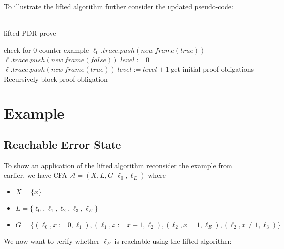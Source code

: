 \documentclass[11pt, a4paper, BCOR=10mm, ngerman, oneside]{scrbook}
\begin{document}
To illustrate the lifted algorithm further consider the updated pseudo-code: \\ \\

\begin{algorithm}[H] 
\caption{lifted-PDR-prove}
\begin{algorithmic}[1]
\State check for 0-counter-example
\State $\ell_0.trace.push(new\ frame(true))$
	\State $\ell.trace.push(new\ frame(false))$
\EndFor
\State $level := 0$
\Statex
\Loop
		\State $\ell.trace.push(new\ frame(true))$
	\EndFor
	\State $level:= level + 1$
	\State get initial proof-obligations 
	\Statex
	\State Recursively block proof-obligation
	\EndIf
	\EndWhile

	\Statex	
			\EndIf
		\EndFor
	\EndFor
\EndLoop
\EndProcedure
\end{algorithmic}
\end{algorithm}

\section{Example}
\subsection{Reachable Error State}
To show an application of the lifted algorithm reconsider the example from earlier, we have CFA  $\mathcal{A} = (X, L, G, \ell_0, \ell_E)$ where
\begin{itemize}
\item $X = \{x\}$
\item $L = \{\ell_0, \ell_1, \ell_2, \ell_3, \ell_E\}$
\item $G = \{(\ell_0, x := 0, \ell_1), (\ell_1, x := x + 1, \ell_2), (\ell_2, x = 1, \ell_E), (\ell_2, x \neq 1, \ell_3) \}$
\end{itemize}

We now want to verify whether $\ell_E$ is reachable using the lifted algorithm: \\ \\
\end{document}
